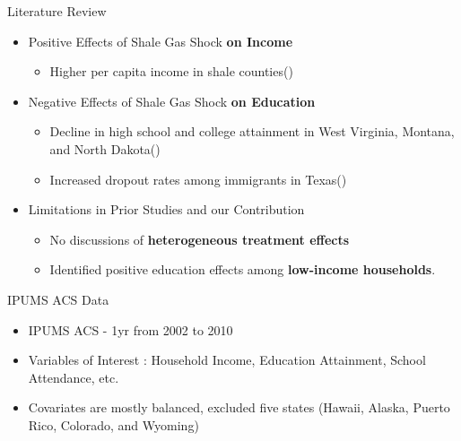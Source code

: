 \documentclass[aspectratio=169,xcolor=dvipsnames]{beamer}
\begin{document}
\begin{frame}{Literature Review}
\begin{itemize}
    \item Positive Effects of Shale Gas Shock \textbf{on Income}
    \begin{itemize}
        \item Higher per capita income in shale counties(\cite{weinstein2011economic})
    \end{itemize}
    
    \item Negative Effects of Shale Gas Shock \textbf{on Education}
    \begin{itemize}
        \item Decline in high school and college attainment in West Virginia, Montana, and North Dakota(\cite{rickman2017shale})
        \item Increased dropout rates among immigrants in Texas(\cite{carpenter2019texas})
    \end{itemize}
    
    \item Limitations in Prior Studies and our Contribution
    \begin{itemize}
        \item No discussions of \textbf{heterogeneous treatment effects}
        \item Identified positive education effects among \textbf{low-income households}.
    \end{itemize}
\end{itemize}
\end{frame}
\begin{frame}{IPUMS ACS Data}
    \footnotesize
    \begin{itemize}
        \item IPUMS ACS - 1yr from 2002 to 2010
        \item Variables of Interest : Household Income, Education Attainment, School Attendance, etc.
        \item Covariates are mostly balanced, excluded five states {\tiny  (Hawaii, Alaska, Puerto Rico, Colorado, and Wyoming)}
    \end{itemize}

\end{frame}
\end{document}

